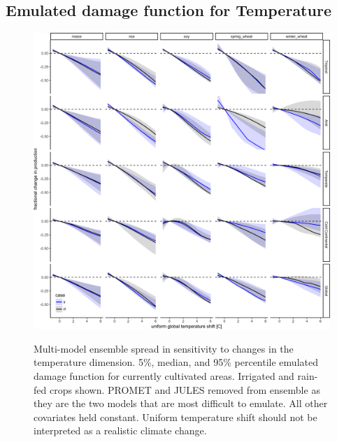 \documentclass[10pt]{article}
\begin{document}
\subsection{Emulated damage function for Temperature}
\begin{figure}[h!]
\includegraphics[width=\textwidth]{s_temp.png}\\
\caption{Multi-model ensemble spread in sensitivity to changes in the temperature dimension. 5\%, median, and 95\% percentile emulated damage function for currently cultivated areas. Irrigated and rain-fed crops shown. PROMET and JULES removed from ensemble as they are the two models that are most difficult to emulate. All other covariates held constant. Uniform temperature shift should not be interpreted as a realistic climate change.}
\label{fig:temperature}
\end{figure}

\clearpage
\end{document}
